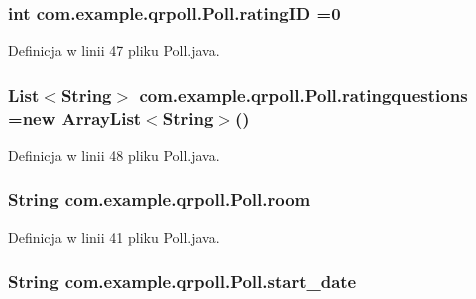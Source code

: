 \hypertarget{classcom_1_1example_1_1qrpoll_1_1_poll_a41aee71def14cf65836f768222a32ba3}{
\subsubsection[{rating\+I\+D}]{\setlength{\rightskip}{0pt plus 5cm}int com.\+example.\+qrpoll.\+Poll.\+rating\+I\+D =0}}\label{classcom_1_1example_1_1qrpoll_1_1_poll_a41aee71def14cf65836f768222a32ba3}


Definicja w linii 47 pliku Poll.\+java.

\hypertarget{classcom_1_1example_1_1qrpoll_1_1_poll_a357dc2acb9f42f2bee8dd88556551637}{
\subsubsection[{ratingquestions}]{\setlength{\rightskip}{0pt plus 5cm}List$<$String$>$ com.\+example.\+qrpoll.\+Poll.\+ratingquestions =new Array\+List$<$String$>$()}}\label{classcom_1_1example_1_1qrpoll_1_1_poll_a357dc2acb9f42f2bee8dd88556551637}


Definicja w linii 48 pliku Poll.\+java.

\hypertarget{classcom_1_1example_1_1qrpoll_1_1_poll_a73035d1fde89a6b4d69cd4e5ee610b8b}{
\subsubsection[{room}]{\setlength{\rightskip}{0pt plus 5cm}String com.\+example.\+qrpoll.\+Poll.\+room\hspace{0.3cm}{\ttfamily [private]}}}\label{classcom_1_1example_1_1qrpoll_1_1_poll_a73035d1fde89a6b4d69cd4e5ee610b8b}


Definicja w linii 41 pliku Poll.\+java.

\hypertarget{classcom_1_1example_1_1qrpoll_1_1_poll_a43059ae0d84924af4a6f876f31ee26d4}{
\subsubsection[{start\+\_\+date}]{\setlength{\rightskip}{0pt plus 5cm}String com.\+example.\+qrpoll.\+Poll.\+start\+\_\+date\hspace{0.3cm}{\ttfamily [private]}}}\label{classcom_1_1example_1_1qrpoll_1_1_poll_a43059ae0d84924af4a6f876f31ee26d4}


